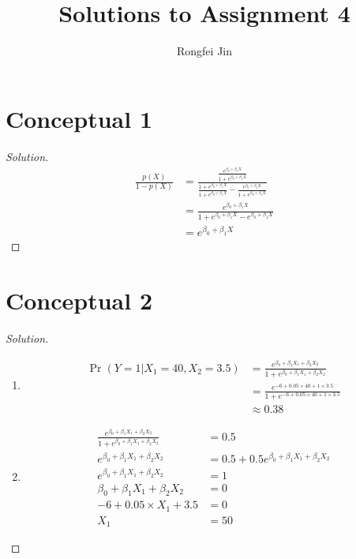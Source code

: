 \documentclass{article}
\title{Solutions to Assignment 4}
\author{Rongfei Jin}
\newenvironment{solution}
  {\renewcommand\qedsymbol{$\blacksquare$}\begin{proof}[Solution]$ $}
  {\end{proof}}
\begin{document}
\pagestyle{fancy}
\fancyhf{}%
\fancyfoot[C]{\thepage}%
\maketitle

\section{Conceptual 1}

\begin{solution}
    \begin{align*}
        \frac{p(X)}{1-p(X)} & = \frac{\frac{e^{\beta_0 + \beta_1 X}}{1+e^{\beta_0 + \beta_1 X}}}{\frac{1+e^{\beta_0 + \beta_1 X}}{1+e^{\beta_0 + \beta_1 X}} - \frac{e^{\beta_0 + \beta_1 X}}{1+e^{\beta_0 + \beta_1 X}}} \\
                            & = \frac{e^{\beta_0 + \beta_1 X}}{1+e^{\beta_0 + \beta_1 X} - e^{\beta_0 + \beta_1 X}}                                                                                                       \\
                            & = e^{\beta_0 + \beta_1 X}
    \end{align*}
\end{solution}


\section{Conceptual 2}
\begin{solution}
    \begin{enumerate}[label=(\alph*)]
        \item
        \begin{align*}
            \Pr(Y = 1 | X_1 = 40, X_2 = 3.5) & = \frac{e^{\beta_0 + \beta_1 X_1 + \beta_2 X_2}}{1+e^{\beta_0 + \beta_1 X_1 + \beta_2 X_2}} \\
                                             & = \frac{e^{-6 + 0.05 \times 40 + 1 \times 3.5}}{1+e^{-6 + 0.05 \times 40 + 1 \times 3.5}}   \\
                                             & \approx 0.38
        \end{align*}

        \item
        \begin{align*}
            \frac{e^{\beta_0 + \beta_1 X_1 + \beta_2 X_2}}{1+e^{\beta_0 + \beta_1 X_1 + \beta_2 X_2}} &= 0.5 \\
             e^{\beta_0 + \beta_1 X_1 + \beta_2 X_2} &= 0.5 + 0.5 e^{\beta_0 + \beta_1 X_1 + \beta_2 X_2} \\
             e^{\beta_0 + \beta_1 X_1 + \beta_2 X_2} &= 1 \\
             \beta_0 + \beta_1 X_1 + \beta_2 X_2 &= 0 \\
             -6 + 0.05 \times X_1 + 3.5 & = 0 \\
             X_1 & = 50
        \end{align*}

    \end{enumerate}
\end{solution}
\newpage
\end{document}
